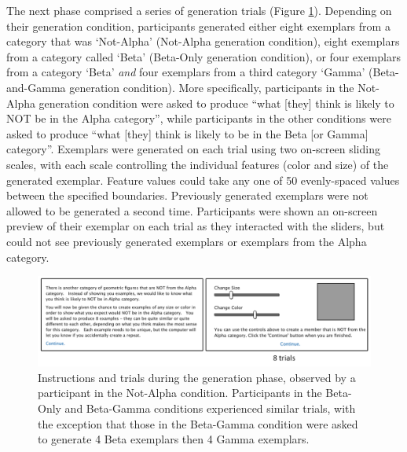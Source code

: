 \documentclass[10pt,letterpaper]{article}
\begin{document}
The next phase comprised a series of generation trials (Figure \ref{fig:screens_gen}). Depending on their generation
condition, participants generated either eight exemplars from a category that was `Not-Alpha' (Not-Alpha generation
condition), eight exemplars from a category called `Beta' (Beta-Only generation condition), or four exemplars from a
category `Beta' \emph{and} four exemplars from a third category `Gamma' (Beta-and-Gamma generation condition). More
specifically, participants in the Not-Alpha generation condition were asked to produce ``what [they] think is likely to
NOT be in the Alpha category'', while participants in the other conditions were asked to produce ``what [they] think is
likely to be in the Beta [or Gamma] category''. Exemplars were generated on each trial using two on-screen sliding
scales, with each scale controlling the individual features (color and size) of the generated exemplar. Feature values
could take any one of 50 evenly-spaced values between the specified boundaries. Previously generated exemplars were not
allowed to be generated a second time. Participants were shown an on-screen preview of their exemplar on each trial as
they interacted with the sliders, but could not see previously generated exemplars or exemplars from the Alpha category.

\begin{figure}%
\begin{center}
    \includegraphics[width=\textwidth]{Figures/screens_gen.png}
\end{center}
\caption{Instructions and trials during the generation phase, observed by a participant in the Not-Alpha condition.
  Participants in the Beta-Only and Beta-Gamma conditions experienced similar trials, with the exception that those in
  the Beta-Gamma condition were asked to generate 4 Beta exemplars then 4 Gamma exemplars.}
\label{fig:screens_gen}
\end{figure}

\end{document}
